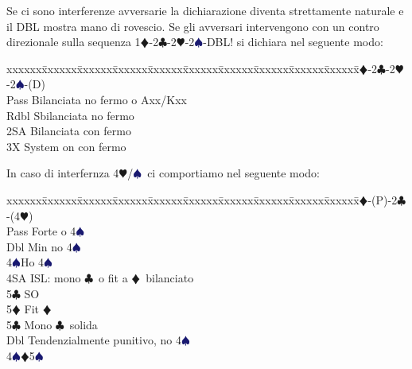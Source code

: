 \documentclass[a4paper,italian]{article}
\newcommand{\BC}{\textcolor{OliveGreen}{$\clubsuit$}}
\newcommand{\BD}{\textcolor{RedOrange}{$\vardiamondsuit$}}
\newcommand{\BH}{\textcolor{Red2}{$\varheartsuit${}}}
\newcommand{\BS}{\textcolor{MidnightBlue}{$\spadesuit${}}}
\newenvironment{bidtable}
{\begin{tabbing}

    xxxxxx\=xxxxxx\=xxxxxx\=xxxxxx\=xxxxxx\=xxxxxx\=xxxxxx\=xxxxxx\=xxxxxx\=xxxxxx\=\kill}
{\end{tabbing} }%
\newenvironment{attenzione}[1]
{\begin{tcolorbox}[colframe=red!80!white,title=#1]}
    {
\end{tcolorbox} }%
\begin{document}
                                    \bigbreak
                                    \begin{attenzione}{Interferenze}
                                        Se ci sono interferenze avversarie la dichiarazione diventa strettamente naturale e il DBL mostra mano di rovescio. Se gli avversari intervengono con un contro direzionale sulla sequenza 1\BD -2\BC -2\BH -2\BS -DBL! si dichiara nel seguente modo:
                                        \bigbreak
                                        \begin{bidtable}
                                            1\BD-2\BC-2\BH-2\BS-(D)\+\\
                                            Pass \> Bilanciata no fermo o Axx/Kxx\\
                                            Rdbl \> Sbilanciata no fermo\\
                                            2SA \> Bilanciata con fermo\\
                                            3X \> System on con fermo\-
                                        \end{bidtable}
                                        \smallbreak
                                        In caso di interfernza 4\BH /\BS\ ci comportiamo nel seguente modo:
                                        \smallbreak
                                        \begin{bidtable}
                                            1\BD-(P)-2\BC-(4\BH)\+\\
                                            Pass \> Forte o 4\BS\+\\
                                            Dbl\> Min no 4\BS\\
                                            4\BS\>Ho 4\BS\\
                                            4SA \>ISL: mono \BC\ o fit a \BD\ bilanciato\+\\
                                            5\BC\> SO\+\\
                                            5\BD\> Fit \BD\-\-\\
                                            5\BC\> Mono \BC\ solida\-\\
                                            Dbl \> Tendenzialmente punitivo, no 4\BS \\
                                            4\BS {}\BD 5\BS \\

\end{bidtable}
\end{attenzione}
\end{document}
